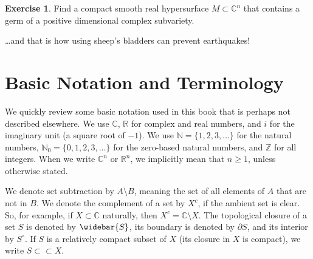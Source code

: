 \documentclass[12pt,openany]{book}
\newcommand{\C}{{\mathbb{C}}}
\newcommand{\R}{{\mathbb{R}}}
\newcommand{\Z}{{\mathbb{Z}}}
\newcommand{\N}{{\mathbb{N}}}
\theoremstyle{plain}
\theoremstyle{remark}
\theoremstyle{definition}
\newenvironment{exbox}{%
    \def\FrameCommand{\vrule width 1pt \relax\hspace{10pt}}%
    \MakeFramed{\advance\hsize-\width\FrameRestore}%
}{%
    \endMakeFramed
}
\theoremstyle{exercise}
\newtheorem{exercise}{Exercise}[section]
\theoremstyle{example}
\begin{document}
\begin{exbox}
\begin{exercise}
Find a compact smooth real hypersurface $M \subset \C^n$ that contains a germ
of a positive dimensional complex subvariety.
\end{exercise}
\end{exbox}

\vspace{1in}

\ldots and that is how using sheep's bladders can prevent
earthquakes!


\appendix



\chapter{Basic Notation and Terminology} \label{ap:basicnotation}



We quickly review some basic notation used in this
book that is perhaps not described elsewhere.
We use $\C$, $\R$ for complex and real numbers, and $i$ for the imaginary unit
(a square root of $-1$).  We use
$\N = \{ 1,2,3, \ldots \}$ for
the natural numbers,
$\N_0 = \{ 0,1,2,3, \ldots \}$ for the zero-based natural numbers,
and $\Z$ for all integers.
When we write $\C^n$ or $\R^n$, we implicitly mean that $n \geq 1$, unless
otherwise stated.

%
We denote set subtraction by $A \setminus B$, meaning the set of all elements of
$A$ that are not in $B$.
We denote the complement of a set by
%
$X^c$, if the ambient set
is clear.  So, for example, if $X \subset \C$ naturally,
then $X^c = \C \setminus X$.
%
The topological closure of a set $S$ is denoted by $\widebar{S}$, its
boundary is denoted by
%
$\partial S$, and its interior by
%
$S^\circ$.
If $S$ is a relatively compact subset of $X$
(its closure in $X$ is compact), we write $S \subset \subset X$.
\end{document}
